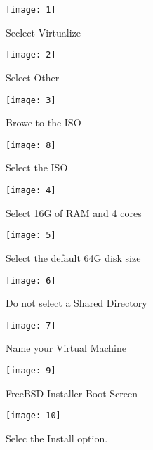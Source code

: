 \begin{figure}
  \centering
\texttt{[image: 1]}
  \caption{Seclect Virtualize}
  \label{fig:utm-start}
\end{figure}

\begin{figure}
  \centering
\texttt{[image: 2]}
  \caption{Select Other}
  \label{fig:utm-other}
\end{figure}

\begin{figure}
  \centering
\texttt{[image: 3]}
  \caption{Browe to the ISO}
  \label{fig:utm-browse}
\end{figure}

\begin{figure}
  \centering
\texttt{[image: 8]}
  \caption{Select the ISO}
  \label{fig:utm-iso}
\end{figure}

\begin{figure}
  \centering
\texttt{[image: 4]}
  \caption{Select 16G of RAM and 4 cores}
  \label{fig:utm-sizing}
\end{figure}

\begin{figure}
  \centering
\texttt{[image: 5]}
  \caption{Select the default 64G disk size}
  \label{fig:utm-disk}
\end{figure}

\begin{figure}
  \centering
\texttt{[image: 6]}
  \caption{Do not select a Shared Directory}
  \label{fig:utm-shared}
\end{figure}

\begin{figure}
  \centering
\texttt{[image: 7]}
  \caption{Name your Virtual Machine}
  \label{fig:utm-summary}
\end{figure}

\begin{figure}
  \centering
\texttt{[image: 9]}
  \caption{FreeBSD Installer Boot Screen}
  \label{fig:utm-fbsd-install-boot}
\end{figure}

\begin{figure}
  \centering
\texttt{[image: 10]}
  \caption{Selec the Install option.}
  \label{fig:utm-fbsd-install}
\end{figure}

